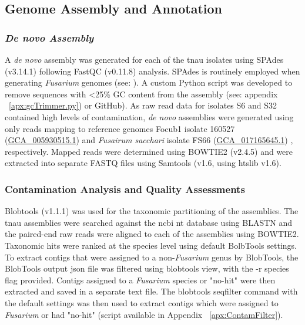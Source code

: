 \subsection{Genome Assembly and Annotation}

\subsubsection{\textit{De novo Assembly}}
A \textit{de novo} assembly was generated for each of the \ac{tnau} isolates using SPAdes (v3.14.1) \parencite{Prjibelski2020} following FastQC (v0.11.8) analysis. SPAdes is routinely employed when generating \textit{Fusarium} genomes
(see: \textcite{Armitage2018, Hudson2020, Tanaka2022}). A custom Python script was developed to remove sequences with <25\% GC content from the assembly (see: appendix ~\ref{apx:gcTrimmer.py}) or GitHub). As raw read data for isolates S6 and S32 contained high levels of contamination, \textit{de novo} assemblies were generated using only reads mapping to reference genomes \ac{Focub1} isolate 160527 (\href{https://www.ncbi.nlm.nih.gov/datasets/genome/GCA_005930515.1/}{GCA\_005930515.1}) \parencite{Asai2019} and \textit{Fusairum sacchari} isolate FS66 (\href{https://www.ncbi.nlm.nih.gov/datasets/genome/GCA_017165645.1/}{GCA\_017165645.1}) \parencite{Cui2021}, respectively. Mapped reads were determined using BOWTIE2 (v2.4.5) and were extracted into separate FASTQ files using Samtools (v1.6, using htslib v1.6). 

\subsubsection{Contamination Analysis and Quality Assessments}
Blobtools (v1.1.1) \parencite{Laetsch2017} was used for the taxonomic partitioning of the assemblies. The \ac{tnau} assemblies were searched against the \ac{ncbi} nt database using BLASTN and the paired-end raw reads were aligned to each of the assemblies using BOWTIE2. Taxonomic hits were ranked at the species level using default BolbTools settings. To extract contigs that were assigned to a non-\textit{Fusarium} genus by BlobTools, the BlobTools output json file was filtered using blobtools view, with the -r species flag provided. Contigs assigned to a \textit{Fusarium} species or "no-hit" were then extracted and saved in a separate text file. The blobtools seqfilter command with the default settings was then used to extract contigs which were assigned to \textit{Fusarium} or had "no-hit" (script available in Appendix ~\ref{apx:ContamFilter}).

